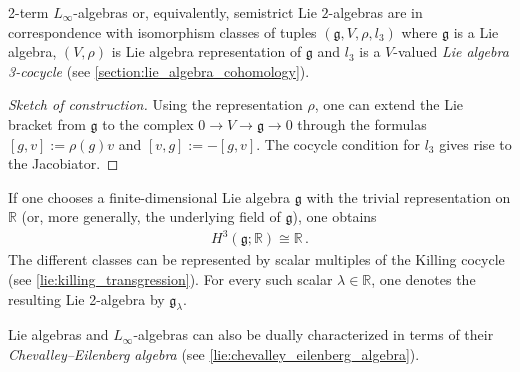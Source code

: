     \begin{property}
        2-term $L_\infty$-algebras or, equivalently, semistrict Lie $2$-algebras are in correspondence with isomorphism classes of tuples $(\mathfrak{g},V,\rho,l_3)$ where $\mathfrak{g}$ is a Lie algebra, $(V,\rho)$ is Lie algebra representation of $\mathfrak{g}$ and $l_3$ is a $V$-valued \textit{Lie algebra 3-cocycle} (see \cref{section:lie_algebra_cohomology}).
        \begin{mdframed}[roundcorner=10pt, linecolor=blue, linewidth=1pt]
            \begin{proof}[Sketch of construction]
                Using the representation $\rho$, one can extend the Lie bracket from $\mathfrak{g}$ to the complex $0\rightarrow V\rightarrow\mathfrak{g}\rightarrow0$ through the formulas $[g,v]:=\rho(g)v$ and $[v,g] := -[g,v]$. The cocycle condition for $l_3$ gives rise to the Jacobiator.
            \end{proof}
        \end{mdframed}
    \end{property}
    \begin{example}\label{hda:gk_lie_2_algebra}
        If one chooses a finite-dimensional Lie algebra $\mathfrak{g}$ with the trivial representation on $\mathbb{R}$ (or, more generally, the underlying field of $\mathfrak{g}$), one obtains
        \begin{gather}
            H^3(\mathfrak{g};\mathbb{R})\cong\mathbb{R}\,.
        \end{gather}
        The different classes can be represented by scalar multiples of the Killing cocycle (see \cref{lie:killing_transgression}). For every such scalar $\lambda\in\mathbb{R}$, one denotes the resulting Lie 2-algebra by $\mathfrak{g}_\lambda$.
    \end{example}

    Lie algebras and $L_\infty$-algebras can also be dually characterized in terms of their \textit{Chevalley--Eilenberg algebra} (see \cref{lie:chevalley_eilenberg_algebra}).

